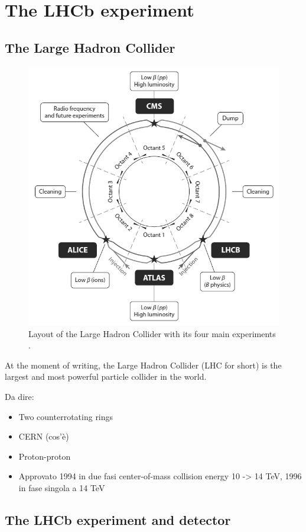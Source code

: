 \chapter{The LHCb experiment}
\label{cap:LHCb}

\section{The Large Hadron Collider}

\begin{figure}[t]
	\centering
	\includegraphics[width=.6\textwidth]{graphics/02-lhcb/lhc_diagram.png}
	\caption[LHC schematic layout.]{Layout of the Large Hadron Collider with its four main experiments \cite{doi:10.1146/annurev-nucl-102010-130438}.}
	\label{fig:2:lhc_diagram}
\end{figure}

At the moment of writing, the Large Hadron Collider (LHC for short) is the largest and most powerful particle collider in the world.

Da dire:
\begin{itemize}
	\item Two counterrotating rings
	\item CERN (cos'è)
	\item Proton-proton
	\item Approvato 1994 in due fasi center-of-mass collision energy 10 -> 14 TeV, 1996 in fase singola a 14 TeV
\end{itemize}


\section{The LHCb experiment and detector}

